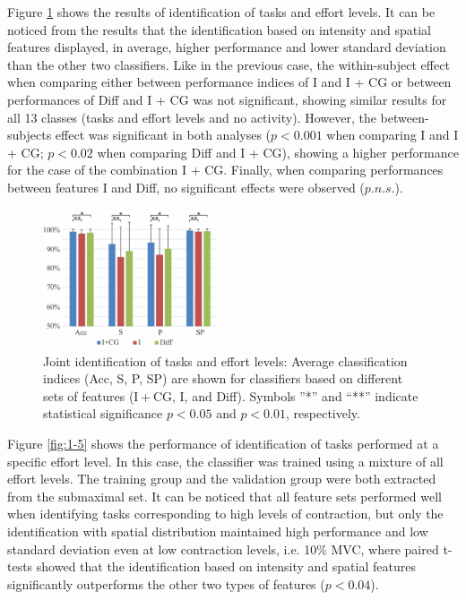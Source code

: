 Figure \ref{fig:1-4} shows the results of identification of tasks and effort levels. It can be noticed from the results that the identification based on intensity and spatial features displayed, in average, higher performance and lower standard deviation than the other two classifiers. Like in the previous case, the within-subject effect when comparing either between performance indices of I and I + CG or between performances of Diff and I + CG was not significant, showing similar results for all 13 classes (tasks and effort levels and no activity). However, the between-subjects effect was significant in both analyses ($p < 0.001$ when comparing I and I + CG; $p < 0.02$ when comparing Diff and I + CG), showing a higher performance for the case of the combination I + CG. Finally, when comparing performances between features I and Diff, no significant effects were observed ($p.n.s.$).

\begin{figure}[ht]
\centering
\includegraphics[width=0.459\textwidth]{Images/figure1_4.png}
\caption{Joint identification of tasks and effort levels: Average classification indices (Acc, S, P, SP) are shown for classifiers based on different sets of features (I + CG, I, and Diff). Symbols ”*” and “**” indicate statistical significance $p < 0.05$ and $p < 0.01$, respectively.}
\label{fig:1-4}
\end{figure}     

Figure \ref{fig:1-5} shows the performance of identification of tasks performed at a specific effort level. In this case, the classifier was trained using a mixture of all effort levels. The training group and the validation group were both extracted from the submaximal set. It can be noticed that all feature sets performed well when identifying tasks corresponding to high levels of contraction, but only the identification with spatial distribution maintained high performance and low standard deviation even at low contraction levels, i.e. 10\% MVC, where paired t-tests showed that the identification based on intensity and spatial features significantly outperforms the other two types of features ($p < 0.04$).

